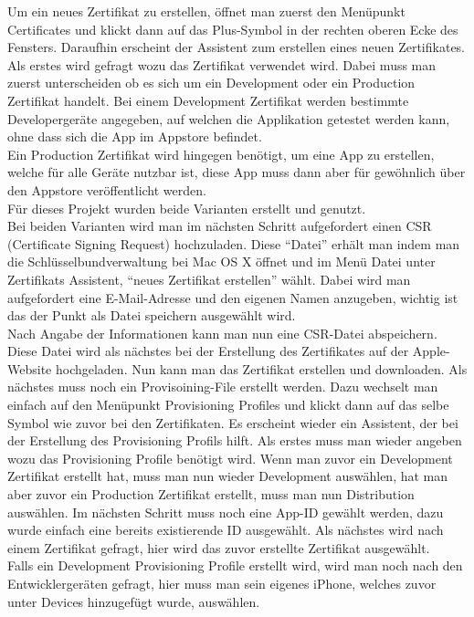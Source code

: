 Um ein neues Zertifikat zu erstellen, öffnet man zuerst den Menüpunkt Certificates und klickt dann auf das Plus-Symbol in der rechten oberen Ecke des Fensters. Daraufhin erscheint der Assistent zum erstellen eines neuen Zertifikates.
Als erstes wird gefragt wozu das Zertifikat verwendet wird. Dabei muss man zuerst unterscheiden ob es sich um ein Development oder ein Production Zertifikat handelt. Bei einem Development Zertifikat
werden bestimmte Developergeräte angegeben, auf welchen die Applikation getestet werden kann, ohne dass sich die App im Appstore befindet.\\
Ein Production Zertifikat wird hingegen benötigt, um eine App zu erstellen, welche für alle Geräte nutzbar ist, diese App muss dann aber für gewöhnlich über den Appstore veröffentlicht werden.\\
Für dieses Projekt wurden beide Varianten erstellt und genutzt.\\
Bei beiden Varianten wird man im nächsten Schritt aufgefordert einen CSR (Certificate Signing Request) hochzuladen. Diese \enquote{Datei} erhält man indem man die Schlüsselbundverwaltung bei Mac OS X öffnet und im Menü Datei unter Zertifikats Assistent, \enquote{neues Zertifikat erstellen} wählt. Dabei wird man aufgefordert eine E-Mail-Adresse und den eigenen Namen anzugeben, wichtig ist das der Punkt als Datei speichern ausgewählt wird.\\
Nach Angabe der Informationen kann man nun eine CSR-Datei abspeichern. Diese Datei wird als nächstes bei der Erstellung des Zertifikates auf der Apple-Website hochgeladen. Nun kann man das Zertifikat erstellen und downloaden.
Als nächstes muss noch ein Provisoining-File erstellt werden. Dazu wechselt man einfach auf den Menüpunkt Provisioning Profiles und klickt dann auf das selbe Symbol wie zuvor bei den Zertifikaten. Es erscheint wieder ein Assistent, der bei der Erstellung des Provisioning Profils hilft. Als erstes muss man wieder angeben wozu das Provisioning Profile benötigt wird. Wenn man zuvor ein Development Zertifikat erstellt hat, muss man nun wieder Development auswählen, hat man aber zuvor ein Production Zertifikat erstellt, muss man nun Distribution auswählen. Im nächsten Schritt muss noch eine App-ID gewählt werden, dazu wurde einfach eine bereits existierende ID ausgewählt. Als nächstes wird nach einem Zertifikat gefragt, hier wird das zuvor erstellte Zertifikat ausgewählt.\\
Falls ein Development Provisioning Profile erstellt wird, wird man noch nach den Entwicklergeräten gefragt, hier muss man sein eigenes iPhone, welches zuvor unter Devices hinzugefügt wurde, auswählen.\\
